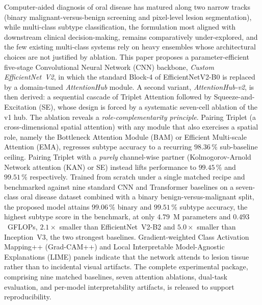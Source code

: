 Computer-aided diagnosis of oral disease has matured along two narrow tracks (binary malignant-versus-benign screening and pixel-level lesion segmentation), while multi-class subtype classification, the formulation most aligned with downstream clinical decision-making, remains comparatively under-explored, and the few existing multi-class systems rely on heavy ensembles whose architectural choices are not justified by ablation. This paper proposes a parameter-efficient five-stage Convolutional Neural Network (CNN) backbone, \emph{Custom EfficientNet~V2}, in which the standard Block-4 of EfficientNetV2-B0 is replaced by a domain-tuned \emph{AttentionHub} module. A second variant, \emph{AttentionHub-v2}, is then derived: a sequential cascade of Triplet Attention followed by Squeeze-and-Excitation (SE), whose design is forced by a systematic seven-cell ablation of the v1 hub. The ablation reveals a \emph{role-complementarity principle}. Pairing Triplet (a cross-dimensional spatial attention) with any module that also exercises a spatial role, namely the Bottleneck Attention Module (BAM) or Efficient Multi-scale Attention (EMA), regresses subtype accuracy to a recurring $98.36\,\%$ sub-baseline ceiling. Pairing Triplet with a \emph{purely} channel-wise partner (Kolmogorov-Arnold Network attention (KAN) or SE) instead lifts performance to $99.45\,\%$ and $99.51\,\%$ respectively. Trained from scratch under a single matched recipe and benchmarked against nine standard CNN and Transformer baselines on a seven-class oral disease dataset combined with a binary benign-versus-malignant split, the proposed model attains $99.06\,\%$ binary and $99.51\,\%$ subtype accuracy, the highest subtype score in the benchmark, at only $4.79$~M parameters and $0.493$~GFLOPs, $2.1\times$ smaller than EfficientNet~V2-B2 and $5.0\times$ smaller than Inception~V3, the two strongest baselines. Gradient-weighted Class Activation Mapping++ (Grad-CAM++) and Local Interpretable Model-Agnostic Explanations (LIME) panels indicate that the network attends to lesion tissue rather than to incidental visual artifacts. The complete experimental package, comprising nine matched baselines, seven attention ablations, dual-task evaluation, and per-model interpretability artifacts, is released to support reproducibility.
